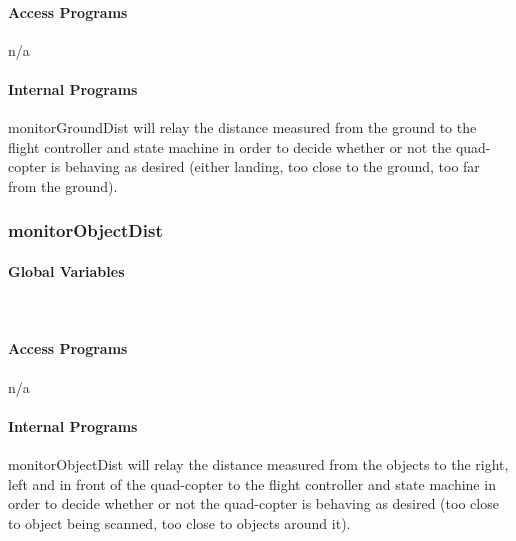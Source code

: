 \documentclass[10pt,letterpaper]{article}
\begin{document}
\paragraph{Access Programs}
n/a 
\paragraph{Internal Programs}
monitorGroundDist will relay the distance measured from the ground to the flight controller and state machine in order to decide whether or not the quad-copter is behaving as desired (either landing, too close to the ground, too far from the ground).

\subsubsection{monitorObjectDist}
\paragraph{Global Variables}
~
\begin{table}[H]
  \caption{monitorObjectDist}
\end{table}
\paragraph{Access Programs}
n/a 
\paragraph{Internal Programs}
monitorObjectDist will relay the distance measured from the objects to the right, left and in front of the quad-copter to the flight controller and state machine in order to decide whether or not the quad-copter is behaving as desired (too close to object being scanned, too close to objects around it).
\end{document}
